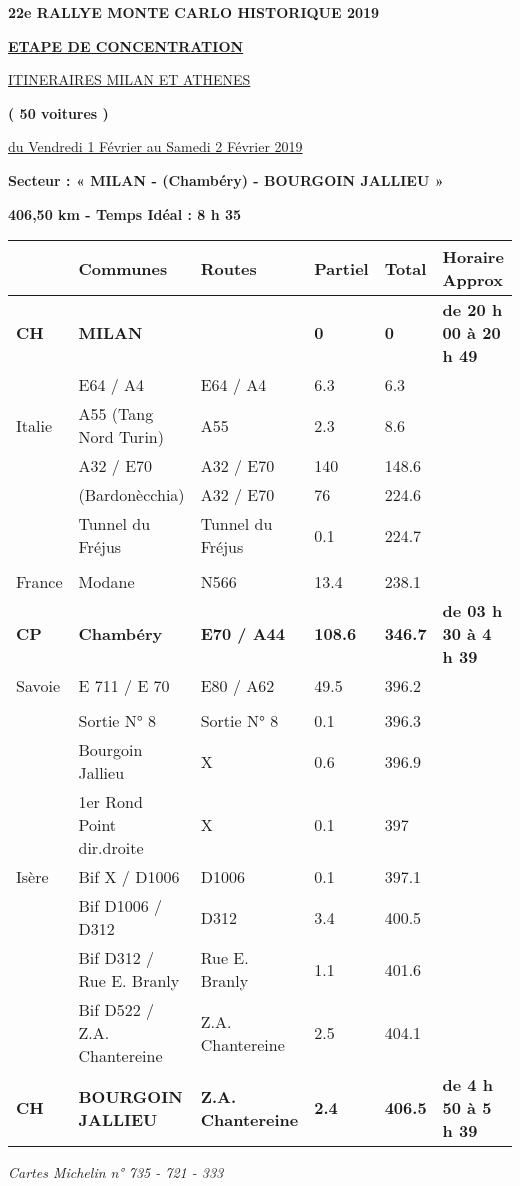 \documentclass{article}%
\begin{document}
%
\normalsize%
\begin{center} \textbf{\LARGE{22e RALLYE MONTE CARLO HISTORIQUE 2019}} \end{center}%
\begin{center} \textbf{\underline{ETAPE DE CONCENTRATION}} \end{center}%
\begin{center} \underline{ITINERAIRES  MILAN ET ATHENES} \end{center}%
\begin{center} \textbf{( 50 voitures )} \end{center}%
\begin{flushright} \underline{du  Vendredi 1 Février au Samedi 2 Février 2019} \end{flushright}%
\begin{flushleft} \textbf{Secteur : «  MILAN - (Chambéry) - BOURGOIN JALLIEU  »
} \end{flushleft}%
\begin{flushright} \textbf{406,50 km - Temps Idéal : 8 h 35 
} \end{flushright}%
\begin{longtable}{p{2.25cm}|p{7.0cm}|p{1.5cm}|p{1.5cm}|p{1.5cm}|p{3.5cm}}%
\hline%
&Communes&Routes&Partiel&Total&Horaire Approx\\%
\hline%
\endhead%
\endfoot%
\endlastfoot%
\textbf{﻿CH}&\textbf{MILAN}& &\textbf{0}&\textbf{0}&\textbf{de 20 h 00 à 20 h 49}\\%
 &E64 / A4 &E64 / A4 &6.3&6.3& \\%
Italie&A55 (Tang Nord Turin)&A55&2.3&8.6& \\%
 &A32 / E70&A32 / E70&140&148.6& \\%
 &(Bardonècchia)&A32 / E70&76&224.6& \\%
 &Tunnel du Fréjus&Tunnel du Fréjus&0.1&224.7& \\%
\hline& & & & & \\%
France&Modane&N566&13.4&238.1& \\%
\textbf{CP}&\textbf{Chambéry}&\textbf{E70 / A44}&\textbf{108.6}&\textbf{346.7}&\textbf{de 03 h 30 à 4 h 39}\\%
Savoie&E 711 / E 70 &E80 / A62&49.5&396.2& \\%
\hline& & & & & \\%
 &Sortie N° 8&Sortie N° 8&0.1&396.3& \\%
 &Bourgoin Jallieu&X&0.6&396.9& \\%
 &1er Rond Point dir.droite&X&0.1&397& \\%
Isère&Bif X / D1006&D1006&0.1&397.1& \\%
 &Bif D1006 / D312&D312&3.4&400.5& \\%
 &Bif D312 / Rue E. Branly&Rue E. Branly&1.1&401.6& \\%
 &Bif D522 / Z.A. Chantereine&Z.A. Chantereine&2.5&404.1& \\%
\textbf{CH }&\textbf{BOURGOIN JALLIEU}&\textbf{Z.A. Chantereine}&\textbf{2.4}&\textbf{406.5}&\textbf{de 4 h 50 à 5 h 39}\\%
\hline%
\end{longtable}%
\begin{flushleft} \textit{Cartes Michelin n° 
735 - 721 - 333
} \end{flushleft}%
\end{document}
